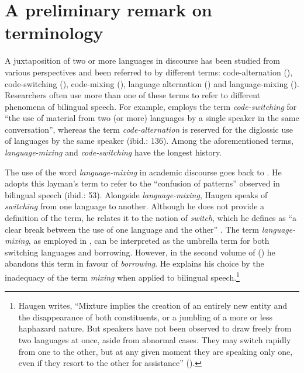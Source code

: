 \section{A preliminary remark on terminology}\label{sec:preliminary}
\begin{sloppypar}
A juxtaposition of two or more languages in discourse has been studied from various perspectives and been referred to by different terms: code-alternation (\citealt{extra-code-copying-1993,johanson-zum-1999, thomason-language-2001,migge-exploring-2013}), code-switching (\citealt{gumperz-social-1972, poplack-sometimes-1980,myers-scotton-duelling-1993,backus-two-1996}), code-mixing (\citealt{muysken-bilingual-2000,muhamedowa-untersuchung-2006}), language alternation (\citealt{auer-bilingual-1984, maschler-transition-1998}) and language-mixing (\citealt{pfaff-1979, backus-patterns-1992,lanza-language-2004}). Researchers often use more than one of these terms to refer to different phenomena of bilingual speech. For example, \citet[][132]{thomason-language-2001} employs the term \textit{code-switching}  for ``the use of material from two (or more) languages by a single speaker in the same conversation'', whereas the term \textit{code-alternation} is reserved for the diglossic use of languages by the same speaker (ibid.: 136). Among the aforementioned terms, \textit {language-mixing} and \textit {code-switching} have the longest history. 
\end{sloppypar}

The use of the word \textit {language-mixing} in academic discourse goes back to \citet[][53]{haugen-1953-vol1}. He adopts this layman's term to refer to the ``confusion of patterns'' observed in bilingual speech (ibid.: 53). Alongside \textit{language-mixing}, Haugen speaks of \textit{switching} from one language to another. Although he does not provide a definition of the term, he relates it to the notion of \textit{switch}, which he defines as ``a clear break between the use of one language and the other'' \citep[65]{haugen-1953-vol1}. The term \textit{language-mixing}, as employed in \citet{haugen-1953-vol1}, can be interpreted as the umbrella term for both switching languages and borrowing. However, in the second volume of  (\citeyear{haugen-1953-vol2}) he abandons this term in favour of \textit{borrowing}. He explains his choice by the inadequacy of the term \textit{mixing} when applied to bilingual speech.\footnote{Haugen writes, ``Mixture implies the creation of an entirely new entity and the disappearance of both constituents, or a jumbling of a more or less haphazard nature. But speakers have not been observed to draw freely from two languages at once, aside from abnormal cases. They may switch rapidly from one to the other, but at any given moment they are speaking only one, even if they resort to the other for assistance'' (\citeyear[362]{haugen-1953-vol2}).}

